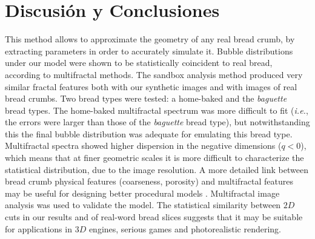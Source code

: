 \documentclass[spanish,a4paper,11pt,oneside,links]{report}
\begin{document}




\section{Discusi\'on y Conclusiones}
This method allows to approximate the geometry of any real bread crumb, by 
extracting parameters in order to accurately simulate it.
Bubble distributions under our model were shown to be statistically coincident to real bread, according to multifractal methods.
The sandbox analysis method produced very similar fractal features both with our synthetic images and with images of real bread crumbs.
Two bread types were tested: a home-baked and the {\em baguette } bread types.
The home-baked multifractal spectrum was more difficult to fit ({\em i.e.}, the errors were larger than those of the {\em baguette} bread type), but notwithstanding this the final bubble distribution was adequate for emulating this bread type.
Multifractal spectra showed higher dispersion in the negative dimensions ($q < 0$), which means that at finer geometric scales it is more difficult to characterize the statistical distribution, due to the image resolution.
A more detailed link between bread crumb physical features (coarseness, porosity) and multifractal features may be useful for designing better procedural models \cite{Baravalle2012}.
Multifractal image analysis was used to validate the model.
The statistical similarity between $2D$ cuts in our results and of real-word bread slices suggests that it may be suitable for applications in $3D$ engines, serious games \cite{Susi2007} and photorealistic rendering. 
\end{document}
